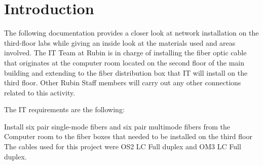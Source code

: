 \section{Introduction}

The following documentation provides a closer look at network installation on the third-floor labs while giving an inside look at the materials used and areas involved. The IT Team at Rubin is in charge of installing the fiber optic cable that originates at the computer room located on the second floor of the main building and extending to the fiber distribution box that IT will install on the third floor. 
Other Rubin Staff members will carry out any other connections related to this activity.



The IT requirements are the following:

Install six pair single-mode fibers and six pair multimode fibers from the Computer room to the fiber boxes that needed to be installed on the third floor 
The cables used for this project were OS2 LC Full duplex and OM3 LC Full duplex.